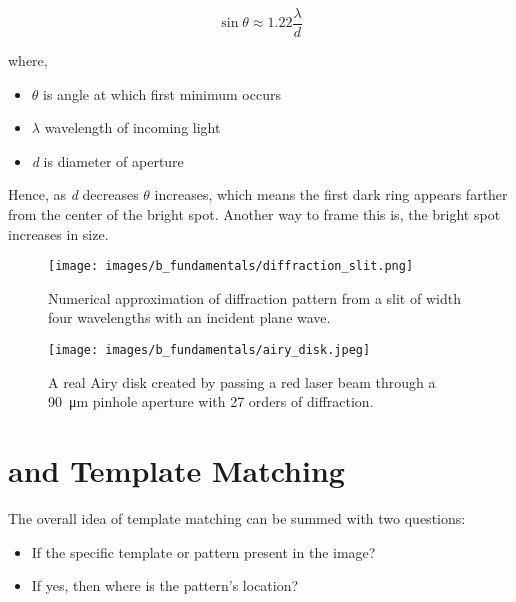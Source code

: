     \vspace{5mm}
    \begin{equation}\label{eqn:objective}
        \sin \theta \approx 1.22 \frac{\lambda}{d}
    \end{equation}

    \vspace{5mm}
    \noindent where,
    \begin{itemize}
        \item $\theta$ is angle at which first minimum occurs
        \item $\lambda$ wavelength of incoming light
        \item \emph{d} is diameter of aperture
    \end{itemize}
    
    \vspace{5mm}
    \noindent Hence, as \emph{d} decreases $\theta$ increases, which means the first dark ring appears farther from the center of the bright spot. Another way to frame this is, the bright spot increases in size.

    \begin{figure}[h]
        \centering
        \texttt{[image: images/b\_fundamentals/diffraction\_slit.png]}
        \caption{Numerical approximation of diffraction pattern from a slit of width four wavelengths with an incident plane wave. \cite{img_diffraction_slit}}
        \label{subfig:diffraction_slit}
    \end{figure}

    \begin{figure}[h]
        \centering
        \texttt{[image: images/b\_fundamentals/airy\_disk.jpeg]}
        \caption{A real Airy disk created by passing a red laser beam through a \SI{90}{\micro\meter} pinhole aperture with 27 orders of diffraction. \cite{img_airy_disk}}
        \label{subfig:airy_disk}
    \end{figure}


    \section*{ and Template Matching}\label{Section:NCC}

    The overall idea of template matching can be summed with two questions:
    
    \begin{itemize}
        \item If the specific template or pattern present in the image?
        \item If yes, then where is the pattern's location?
    \end{itemize}

